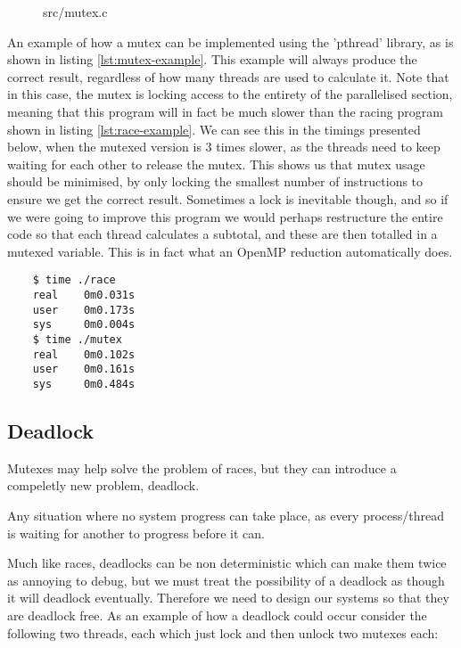 \begin{figure}
  
  {src/mutex.c}
\end{figure}

An example of how a mutex can be implemented using the 'pthread' library, as is shown in listing \ref{lst:mutex-example}. This example will always produce the correct result, regardless of how many threads are used to calculate it. Note that in this case, the mutex is locking access to the entirety of the parallelised section, meaning that this program will in fact be much slower than the racing program shown in listing \ref{lst:race-example}. We can see this in the timings presented below, when the mutexed version is 3 times slower, as the threads need to keep waiting for each other to release the mutex. This shows us that mutex usage should be minimised, by only locking the smallest number of instructions to ensure we get the correct result. Sometimes a lock is inevitable though, and so if we were going to improve this program we would perhaps restructure the entire code so that each thread calculates a subtotal, and these are then totalled in a mutexed variable. This is in fact what an OpenMP reduction automatically does.

\begin{minipage}{1.0\linewidth}
  \begin{verbatim}
    $ time ./race
    real    0m0.031s
    user    0m0.173s
    sys     0m0.004s
    $ time ./mutex
    real    0m0.102s
    user    0m0.161s
    sys     0m0.484s
  \end{verbatim}
\end{minipage}

\subsection{Deadlock}

Mutexes may help solve the problem of races, but they can introduce a compeletly new problem, deadlock. 

\begin{definition}[Deadlock]
  Any situation where no system progress can take place, as every process/thread is waiting for another to progress before it can.
\end{definition}

Much like races, deadlocks can be non deterministic which can make them twice as annoying to debug, but we must treat the possibility of a deadlock as though it will deadlock eventually. Therefore we need to design our systems so that they are deadlock free. As an example of how a deadlock could occur consider the following two threads, each which just lock and then unlock two mutexes each:


